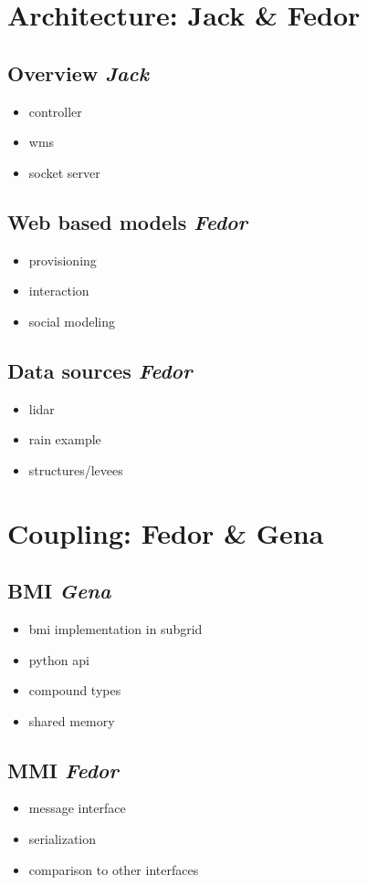 \documentclass[a4paper]{article}
\begin{document}
\section{Architecture: Jack \& Fedor}
\subsection{Overview \emph{Jack}}
\begin{itemize}
  \item controller
  \item wms
  \item socket server
\end{itemize}
\subsection{Web based models \emph{Fedor}}
\begin{itemize}
  \item provisioning
  \item interaction
  \item social modeling
\end{itemize}
\subsection{Data sources \emph{Fedor}}
\begin{itemize}
  \item lidar
  \item rain example
  \item structures/levees
\end{itemize}

\section{Coupling: Fedor \& Gena}
\subsection{BMI \emph{Gena}}
\begin{itemize}
  \item bmi implementation in subgrid
  \item python api
  \item compound types
  \item shared memory
\end{itemize}
\subsection{MMI \emph{Fedor}}
\begin{itemize}
  \item message interface
  \item serialization
  \item comparison to other interfaces
\end{itemize}
\end{document}
